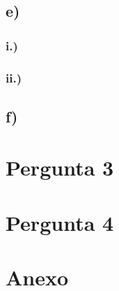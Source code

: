 \documentclass[a4paper, 12pt]{article}
\begin{document}
\subsection*{e)}
\subsubsection*{i.)}
\subsubsection*{ii.)}
\subsection*{f)}

\section{Pergunta 3}

\section{Pergunta 4}

\section{Anexo}
\end{document}

